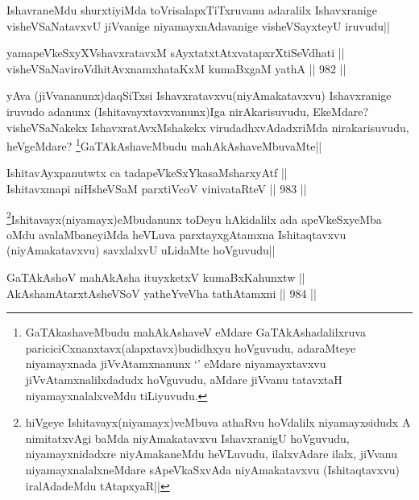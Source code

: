 \begin{artha}
IshavraneMdu shurxtiyiMda toVrisalapxTiTxruvanu adaralilx Ishavxranige visheVSaNatavxvU jiVvanige niyamayxnAdavanige visheVSayxteyU iruvudu||
\end{artha}


\begin{shl}
yamapeVkeSxyXVshavxratavxM sAyxtatxtAtxvatapxrXtiSeVdhati || \\
visheVSaNaviroVdhitAvxnamxhataKxM kumaBxgaM yathA ||  982 ||  
\end{shl}

\begin{artha}
yAva (jiVvananunx)daqSiTxsi Ishavxratavxvu(niyAmakatavxvu) Ishavxranige iruvudo adanunx (Ishitavayxtavxvanunx)Iga nirAkarisuvudu, EkeMdare? visheVSaNakekx IshavxratAvxMshakekx virudadhxvAdadxriMda nirakarisuvudu, heVgeMdare? \footnote{GaTAkashaveMbudu mahAkAshaveV eMdare GaTAkAshadalilxruva pariciciCxnanxtavx(alapxtavx)budidhxyu hoVguvudu, adaraMteye niyamayxnada jiVvAtamxnanunx `\stext' eMdare niyamayxtavxvu jiVvAtamxnalilxdadudx hoVguvudu, aMdare jiVvanu tatavxtaH niyamayxnalalxveMdu tiLiyuvudu.}GaTAkAshaveMbudu mahAkAshaveMbuvaMte||
\end{artha}

\begin{shl}
IshitavAyxpanutwtx ca tadapeVkeSxYkasaMsharxyAtf || \\
Ishitavxmapi niHsheVSaM parxtiVcoV vinivataRteV ||  983 ||  
\end{shl}

\begin{artha}
\footnote{hiVgeye Ishitavayx(niyamayx)veMbuva athaRvu hoVdalilx niyamayxsidudx A nimitatxvAgi baMda niyAmakatavxvu IshavxranigU hoVguvudu, niyamayxnidadxre niyAmakaneMdu heVLuvudu, ilalxvAdare ilalx, jiVvanu niyamayxnalalxneMdare sApeVkaSxvAda niyAmakatavxvu (Ishitaqtavxvu) iralAdadeMdu tAtapxyaR||}Ishitavayx(niyamayx)eMbudanunx toDeyu hAkidalilx ada apeVkeSxyeMba oMdu avalaMbaneyiMda heVLuva parxtayxgAtamxna Ishitaqtavxvu (niyAmakatavxvu) savxlalxvU uLidaMte hoVguvudu||
\end{artha}

\begin{shl}
GaTAkAshoV mahAkAsha ituyxketxV kumaBxKahunxtw || \\
AkAshamAtarxtAsheVSoV yatheYveVha tathA\s \s tamxni ||  984 ||  
\end{shl}

